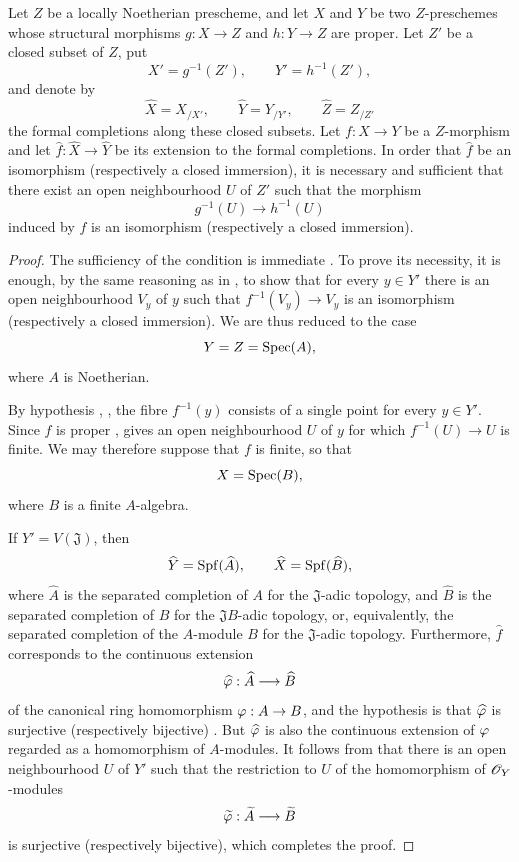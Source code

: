 \begin{proposition}[4.6.8]
\label{III.4.6.8}
Let $Z$ be a locally Noetherian prescheme, and let $X$ and $Y$ be
two $Z$-preschemes whose structural morphisms
$g:X\to Z$ and $h:Y\to Z$ are proper.  Let $Z'$ be a closed subset
of $Z$, put
\[
  X'=g^{-1}(Z'),\qquad Y'=h^{-1}(Z'),
\]
and denote by
\[
  \widehat X=X_{/X'},\qquad
  \widehat Y=Y_{/Y'},\qquad
  \widehat Z=Z_{/Z'}
\]
the formal completions along these closed subsets.  Let $f:X\to Y$
be a $Z$-morphism and let
$\widehat f:\widehat X\to\widehat Y$ be its extension to the formal
completions.  In order that $\widehat f$ be an isomorphism
(respectively a closed immersion), it is necessary and sufficient
that there exist an open neighbourhood $U$ of $Z'$ such that the
morphism
\[
  g^{-1}(U)\longrightarrow h^{-1}(U)
\]
induced by $f$ is an isomorphism (respectively a closed immersion).
\end{proposition}

\begin{proof}
The sufficiency of the condition is immediate
.  To prove its necessity, it is enough, by the
same reasoning as in , to show that for every
$y\in Y'$ there is an open neighbourhood $V_y$ of $y$ such that
$f^{-1}(V_y)\to V_y$ is an isomorphism (respectively a closed
immersion).  We are thus reduced to the case
\[
  Y=Z=\operatorname{Spec}(A),
\]
where $A$ is Noetherian.

By hypothesis , , the fibre
$f^{-1}(y)$ consists of a single point for every $y\in Y'$.  Since
$f$ is proper ,  gives an open
neighbourhood $U$ of $y$ for which $f^{-1}(U)\to U$ is finite.  We
may therefore suppose that $f$ is finite, so that
\[
  X=\operatorname{Spec}(B),
\]
where $B$ is a finite $A$-algebra.

If $Y'=V(\mathfrak J)$, then
\[
  \widehat Y=\operatorname{Spf}(\widehat A),
  \qquad
  \widehat X=\operatorname{Spf}(\widehat B),
\]
where $\widehat A$ is the separated completion of $A$ for the
$\mathfrak J$-adic topology, and $\widehat B$ is the separated
completion of $B$ for the $\mathfrak JB$-adic topology, or,
equivalently, the separated completion of the $A$-module $B$ for
the $\mathfrak J$-adic topology.  Furthermore, $\widehat f$
corresponds to the continuous extension
\[
  \widehat{\varphi}:\widehat A\longrightarrow\widehat B
\]
of the canonical ring homomorphism $\varphi:A\to B$, and the
hypothesis is that $\widehat{\varphi}$ is surjective (respectively
bijective) .  But $\widehat{\varphi}$ is also the
continuous extension of $\varphi$ regarded as a homomorphism of
$A$-modules.  It follows from  that there is an
open neighbourhood $U$ of $Y'$ such that the restriction to $U$ of
the homomorphism of $\mathscr{O}_Y$-modules
\[
  \widetilde{\varphi}:\widetilde A\longrightarrow\widetilde B
\]
is surjective (respectively bijective), which completes the proof.
\end{proof}



